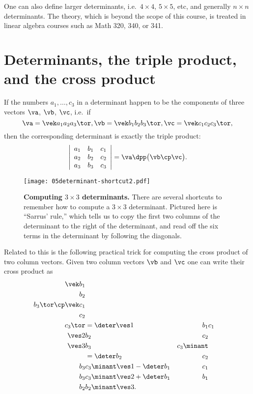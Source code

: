 One can also define larger determinants, i.e.~$4\times4$, $5\times5$,
etc, and generally $n\times n$ determinants.  The theory, which is
beyond the scope of this course, is treated in linear algebra courses
such as Math 320, 340, or 341.

\section{Determinants, the triple product, and the cross product} %
\label{sec:determ-triple-prod-cross-prod}
If the numbers $a_1, \dots, c_3$ in a determinant happen to be the
components of three vectors $\va$, $\vb$, $\vc$, i.e.~if
\[
\va = \vek a_1\\ a_2 \\a_3\tor, \vb = \vek b_1\\ b_2 \\b_3\tor, \vc =
\vek c_1\\ c_2 \\c_3\tor,
\]
then the corresponding determinant is exactly the triple product:
\begin{equation}
  \left|
    \begin{array}{ccc}
      a_1 & b_1 & c_1 \\
      a_2 & b_2 & c_2 \\
      a_3 & b_3 & c_3
    \end{array}
  \right|= \va\dpp\bigl(\vb\cp\vc\bigr).
\end{equation}%
\begin{figure}[t]
  \texttt{[image: 05determinant-shortcut2.pdf]}
  \caption{\textbf{Computing $3\times3$ determinants. } There are several
    shortcuts to remember how to compute a $3\times3$ determinant.
    Pictured here is ``Sarrus' rule,'' which tells us to copy the
    first two columns of the determinant to the right of the
    determinant, and read off the six terms in the determinant by
    following the diagonals. }
  \label{fig:Sarrus}
\end{figure}%
Related to this is the following practical trick for computing the
cross product of two column vectors.  Given two column vectors $\vb$
and $\vc$ one can write their cross product as 
\begin{align*}
  \vek b_1\\b_2\\b_3\tor\cp \vek c_1\\c_2\\c_3\tor
  &=
  \deter
  \ves1 & b_1 & c_1 \\
  \ves2 & b_2 & c_2 \\
  \ves3 & b_3 & c_3
  \minant \\
  &=  \deter b_2 & c_2 \\ b_3 & c_3 \minant \ves1
    - \deter b_1 & c_1 \\ b_3 & c_3 \minant \ves2
    + \deter b_1 & b_1 \\ b_2 & b_2 \minant \ves3 .
\end{align*}
